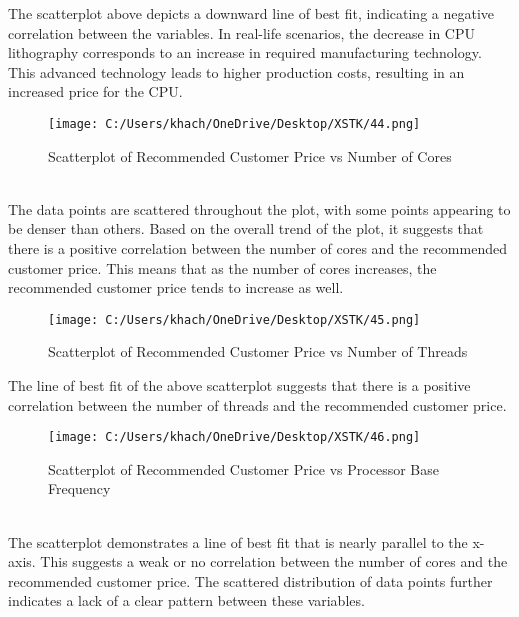\documentclass[a4paper]{article}
\begin{document}
	\newpage
	The scatterplot above depicts a downward line of best fit, indicating a negative correlation between the variables. In real-life scenarios, the decrease in CPU lithography corresponds to an increase in required manufacturing technology. This advanced technology leads to higher production costs, resulting in an increased price for the CPU.
	\begin{figure}[htbp]
		\centering
		\begin{adjustbox}{width=0.5\textwidth, frame}
			\texttt{[image: C:/Users/khach/OneDrive/Desktop/XSTK/44.png]}
		\end{adjustbox}
		\captionsetup{justification=centering}
		\vspace{0.5cm}
		\caption{Scatterplot of Recommended Customer Price vs Number of Cores}
	\end{figure}
	\\
	The data points are scattered throughout the plot, with some points appearing to be denser than others. Based on the overall trend of the plot, it suggests that there is a positive correlation between the number of cores and the recommended customer price. This means that as the number of cores increases, the recommended customer price tends to increase as well.
	\begin{figure}[htbp]
		\centering
		\begin{adjustbox}{width=0.5\textwidth, frame}
			\texttt{[image: C:/Users/khach/OneDrive/Desktop/XSTK/45.png]}
		\end{adjustbox}
		\captionsetup{justification=centering}
		\vspace{0.5cm}
		\caption{Scatterplot of Recommended Customer Price vs Number of Threads}
	\end{figure}
	\newpage
	The line of best fit of the above scatterplot suggests that there is a positive correlation between the number of threads and the recommended customer price.
	\begin{figure}[htbp]
		\centering
		\begin{adjustbox}{width=0.5\textwidth, frame}
			\texttt{[image: C:/Users/khach/OneDrive/Desktop/XSTK/46.png]}
		\end{adjustbox}
		\captionsetup{justification=centering}
		\vspace{0.5cm}
		\caption{Scatterplot of Recommended Customer Price vs Processor Base Frequency}
	\end{figure}
	\\
	The scatterplot demonstrates a line of best fit that is nearly parallel to the x-axis. This suggests a weak or no correlation between the number of cores and the recommended customer price. The scattered distribution of data points further indicates a lack of a clear pattern between these variables.
\end{document}
